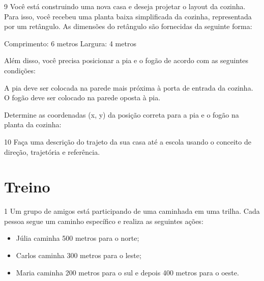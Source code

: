 \num{9} Você está construindo uma nova casa e deseja projetar o layout da
cozinha. Para isso, você recebeu uma planta baixa simplificada da
cozinha, representada por um retângulo. As dimensões do retângulo são
fornecidas da seguinte forma:

Comprimento: 6 metros Largura: 4 metros

Além disso, você precisa posicionar a pia e o fogão de acordo com as
seguintes condições:

A pia deve ser colocada na parede mais próxima à porta de entrada da
cozinha. O fogão deve ser colocado na parede oposta à pia.

Determine as coordenadas (x, y) da posição correta para a pia e o fogão
na planta da cozinha:


\num{10} Faça uma descrição do trajeto da sua casa até a escola usando o
conceito de direção, trajetória e referência.


\section*{Treino}

\num{1} Um grupo de amigos está participando de uma caminhada em uma trilha.
Cada pessoa segue um caminho específico e realiza as seguintes ações:

\begin{itemize}[itemsep=5pt]
\item Júlia caminha 500 metros para o norte; 
\item Carlos caminha 300 metros para o leste; 
\item Maria caminha 200 metros para o sul e depois 400 metros para o oeste.
\end{itemize}

